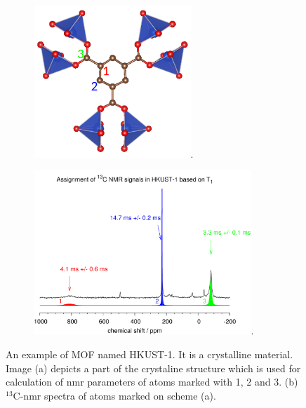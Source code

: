 \documentclass[openany, longbibliography,slovene,a4paper,12pt]{article}
\begin{document}
 \begin{figure}
   \centering
      \begin{subfigure}[b]{0.5\textwidth}
  \centering
  \includegraphics[width=0.65\textwidth]{hkust_molekula_placeholder.png}.
  \caption{}
\end{subfigure}%
   \begin{subfigure}[b]{0.5\textwidth}
  \centering
  \includegraphics[width=0.9\textwidth]{hkust_spekter.png}.
  \caption{}
\end{subfigure}
  \caption{ An example of MOF named HKUST-1. It is a crystalline
    material. Image (a) depicts a part of the crystaline structure which is used for calculation of
    nmr parameters of atoms marked with 1, 2 and 3. (b) $^{13}\mathrm{C}$-nmr
    spectra of atoms marked on scheme (a).
  }
  \end{figure}
\end{document}

